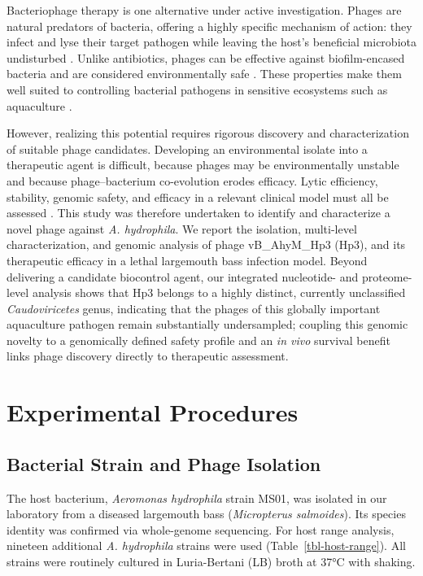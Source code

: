 \documentclass[11pt,a4paper]{article}
\begin{document}
Bacteriophage therapy is one alternative under active investigation.
Phages are natural predators of bacteria, offering a highly
specific mechanism of action: they infect and lyse their target pathogen
while leaving the host's beneficial microbiota undisturbed
\citep{2019-Phage_GordilloAltamirano}. Unlike antibiotics, phages can be
effective against biofilm-encased bacteria and are considered
environmentally safe \citep{2023-Potential_Guo}. These properties make
them well suited to controlling bacterial pathogens
in sensitive ecosystems such as aquaculture \citep{2021-Phage_Ramos-Vivas}.

However, realizing this potential requires rigorous discovery and
characterization of suitable phage candidates.
Developing an environmental isolate into a therapeutic agent is
difficult, because phages may be environmentally unstable and because
phage--bacterium co-evolution erodes efficacy. Lytic efficiency,
stability, genomic safety, and efficacy in a relevant clinical model
must all be assessed
\citep{2025-Reevaluating_Cook, 2018-Phage_Torres-Barcelo}. This study
was therefore undertaken to identify and characterize a
novel phage against \emph{A. hydrophila}. We report the isolation,
multi-level characterization, and genomic analysis of phage
vB\_AhyM\_Hp3 (Hp3), and its
therapeutic efficacy in a lethal largemouth bass infection model.
Beyond delivering a candidate biocontrol agent, our integrated
nucleotide- and proteome-level analysis shows that Hp3 belongs to a
highly distinct, currently unclassified \emph{Caudoviricetes} genus,
indicating that the phages of this globally important aquaculture
pathogen remain substantially undersampled; coupling this genomic
novelty to a genomically defined safety profile and an \emph{in vivo}
survival benefit links phage discovery directly to therapeutic
assessment.

\section{Experimental Procedures}\label{experimental-procedures}

\subsection{Bacterial Strain and Phage
Isolation}\label{bacterial-strain-and-phage-isolation}

The host bacterium, \emph{Aeromonas hydrophila} strain MS01, was
isolated in our laboratory from a diseased largemouth bass
(\emph{Micropterus salmoides}). Its species identity was confirmed via
whole-genome sequencing. For host range analysis, nineteen additional
\emph{A. hydrophila} strains were used (Table~\ref{tbl-host-range}). All
strains were routinely cultured in Luria-Bertani (LB) broth at 37°C with
shaking.
\end{document}
